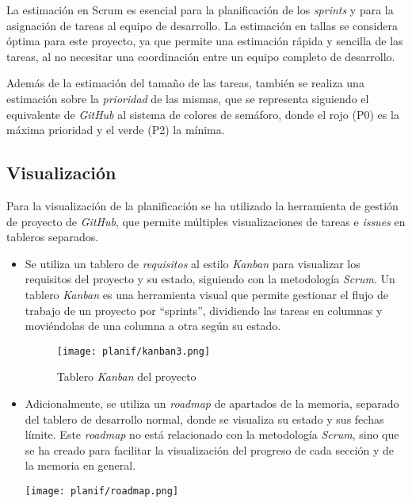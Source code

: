 La estimación en Scrum es esencial para la planificación de los \textit{sprints}
y para la asignación de tareas al equipo de desarrollo. La estimación en tallas
se considera óptima para este proyecto, ya que permite una estimación rápida y
sencilla de las tareas, al no necesitar una coordinación entre un equipo
completo de desarrollo.

Además de la estimación del tamaño de las tareas, también se realiza una
estimación sobre la \textit{prioridad} de las mismas, que se representa
siguiendo el equivalente de \textit{GitHub} al sistema de colores de semáforo,
donde el rojo (P0) es la máxima prioridad y el verde (P2) la mínima.

\newpage{}
\subsection{Visualización}\label{subsec:visual_planif}
Para la visualización de la planificación se ha utilizado la herramienta de
gestión de proyecto de \textit{GitHub}, que permite múltiples visualizaciones de
tareas e \textit{issues} en tableros separados.

\begin{itemize}
	\item Se utiliza un tablero de \textit{requisitos} al estilo \textit{Kanban}
		para visualizar los requisitos del proyecto y su estado, siguiendo con
		la metodología \textit{Scrum}. Un tablero \textit{Kanban} es una
		herramienta visual que permite gestionar el flujo de trabajo de un
		proyecto por ``sprints'', dividiendo las tareas en columnas y
		moviéndolas de una columna a otra según su estado.

		\begin{figure}[H]
			\centering
			\texttt{[image: planif/kanban3.png]}
			\caption{Tablero \textit{Kanban} del proyecto}
			\label{fig:kanban}
		\end{figure}
	\item Adicionalmente, se utiliza un \textit{roadmap} de apartados de la
		memoria, separado del tablero de desarrollo normal, donde se visualiza
		su estado y sus fechas límite. Este \textit{roadmap} no está relacionado
		con la metodología \textit{Scrum}, sino que se ha creado para facilitar
		la visualización del progreso de cada sección y de la memoria en general.

		\begin{minipage}{\linewidth}
			\centering
			\texttt{[image: planif/roadmap.png]}
		\end{minipage}
\end{itemize}


